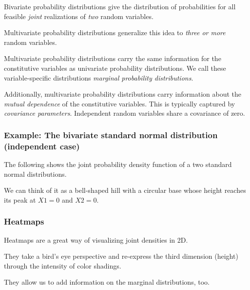 \documentclass[
  11pt,
]{article}
\begin{document}
Bivariate probability distributions give the distribution of probabilities for all feasible \emph{joint} realizations of \emph{two} random variables.

Multivariate probability distributions generalize this idea to \emph{three or more} random variables.

Multivariate probability distributions carry the same information for the constitutive variables as univariate probability distributions. We call these variable-specific distributions \emph{marginal probability distributions}.

Additionally, multivariate probability distributions carry information about the \emph{mutual dependence} of the constitutive variables. This is typically captured by \emph{covariance parameters}. Independent random variables share a covariance of zero.

\hypertarget{example-the-bivariate-standard-normal-distribution-independent-case}{%
\subsubsection{Example: The bivariate standard normal distribution (independent case)}\label{example-the-bivariate-standard-normal-distribution-independent-case}}

The following shows the joint probability density function of a two standard normal distributions.

We can think of it as a bell-shaped hill with a circular base whose height reaches its peak at \(X1 = 0\) and \(X2 = 0\).

\hypertarget{heatmaps}{%
\subsubsection{Heatmaps}\label{heatmaps}}

Heatmaps are a great way of visualizing joint densities in 2D.

They take a bird's eye perspective and re-express the third dimension (height) through the intensity of color shadings.

They allow us to add information on the marginal distributions, too.
\end{document}
